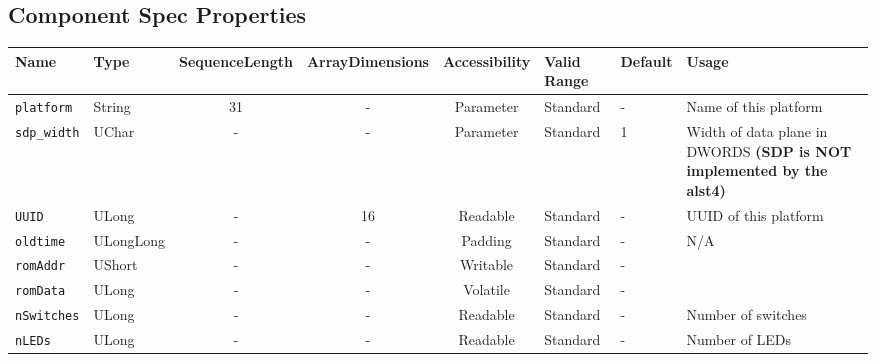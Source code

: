 \documentclass{article}
\begin{document}
\begin{landscape}
	\section*{Component Spec Properties}
	\begin{scriptsize}
		\begin{tabular}{|p{3cm}|p{1.5cm}|c|c|c|p{1.5cm}|p{1cm}|p{6cm}|}
			\hline
			\rowcolor{blue}
			Name               & Type   & SequenceLength & ArrayDimensions & Accessibility      & Valid Range & Default & Usage                                                                         \\
			\hline
			\verb+platform+    & String & 31             & -               & Parameter & Standard & - & Name of this platform                                                     \\
			\hline
			\verb+sdp_width+   & UChar  & -              & -               & Parameter & Standard & 1 & Width of data plane in DWORDS \newline \textbf{(SDP is NOT implemented by the alst4)} \\
			\hline
			\verb+UUID+        & ULong  & -              & 16              & Readable           & Standard    & -       & UUID of this platform                                                         \\
			\hline
			\verb+oldtime+     & ULongLong & -           & -               & Padding            & Standard    & -       & N/A                                                                           \\
			\hline
			\verb+romAddr+     & UShort & -              & -               & Writable           & Standard    & -       &                                                                               \\
			\hline
			\verb+romData+     & ULong  & -              & -               & Volatile           & Standard    & -       &                                                                               \\
			\hline
			\verb+nSwitches+   & ULong  & -              & -               & Readable           & Standard    & -       & Number of switches                                                            \\
			\hline
			\verb+nLEDs+       & ULong  & -              & -               & Readable           & Standard    & -       & Number of LEDs                                                                \\

\end{tabular}
\end{scriptsize}
\end{landscape}
\end{document}
